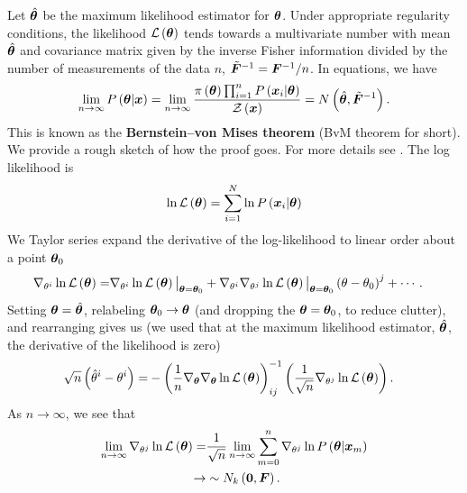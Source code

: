 Let $\hat{{\bm \theta}}$ be the maximum likelihood estimator for ${\bm \theta}$.
Under appropriate regularity conditions,
the likelihood $\mathcal{L}\left({\bm \theta}\right)$ 
tends towards a multivariate number with mean $\hat{{\bm \theta}}$ and 
covariance matrix given by the inverse Fisher information divided by the number of measurements of the data $n$, 
$\tilde{{\bm F}}^{-1}={\bm F}^{-1}/n$. 
In equations, we have
\begin{align}
    \lim_{n\to\infty}P\left({\bm \theta}|{\bm x}\right)
    =
    \lim_{n\to\infty}\frac{\pi\left({\bm \theta}\right)\prod_{i=1}^nP\left({\bm x}_i|{\bm \theta}\right)}{\mathcal{Z}\left({\bm x}\right)}
    =
    N\left(\hat{{\bm \theta}},\tilde{{\bm F}}^{-1}\right)
    .
\end{align}
This is known as the \textbf{Bernstein–von Mises theorem} (BvM theorem for short). 
We provide a rough sketch of how the proof goes. 
For more details see \cite{wasserman2010statistics}.
The log likelihood is
\begin{align}
    \ln\mathcal{L}\left({\bm \theta}\right)
    =
    \sum_{i=1}^N\ln P\left({\bm x}_{i}|{\bm \theta}\right)
\end{align}
We Taylor series expand the derivative of the log-likelihood to linear order about a point 
${\bm \theta}_0$
\begin{align}
    \nabla_{\theta^i}\ln\mathcal{L}\left({\bm \theta}\right)
    =&
    \nabla_{\theta^i}\ln\mathcal{L}\left({\bm \theta}\right)\big|_{{\bm \theta}={\bm \theta}_0}
    +
    \nabla_{\theta^i}\nabla_{\theta^j}\ln\mathcal{L}\left({\bm \theta}\right)\big|_{{\bm \theta}={\bm \theta}_0}
    \left(\theta-\theta_0\right)^j
    +
    \cdots
    .
\end{align}
Setting ${\bm \theta}=\hat{{\bm \theta}}$, relabeling ${\bm \theta}_0\to{\bm \theta}$
(and dropping the ${\bm \theta}={\bm \theta}_0$, to reduce clutter), and rearranging gives us 
(we used that at the maximum likelihood estimator, $\hat{{\bm \theta}}$, the derivative of the likelihood is zero)
\begin{align}
    \sqrt{n}\left(\hat{\theta}^i - \theta^i\right)
    =&
    -
    \left(\frac{1}{n}\nabla_{{\bm \theta}}\nabla_{{\bm \theta}}\ln\mathcal{L}\left({\bm \theta}\right)\right)^{-1}_{ij}
    \left(\frac{1}{\sqrt{n}}\nabla_{\theta^j}\ln\mathcal{L}\left({\bm \theta}\right)\right)
    .
\end{align}
As $n\to\infty$, we see that
\begin{align}
    \lim_{n\to\infty}\nabla_{\theta^j}\ln\mathcal{L}\left({\bm \theta}\right)
    =&
    \frac{1}{\sqrt{n}}\lim_{n\to\infty}\sum_{m=0}^n\nabla_{\theta^j}\ln P\left({\bm \theta}|{\bm x}_{m}\right)
    \nonumber\\
    \to & \sim
    N_k\left({\bm 0},{\bm F}\right)
    .
\end{align}
